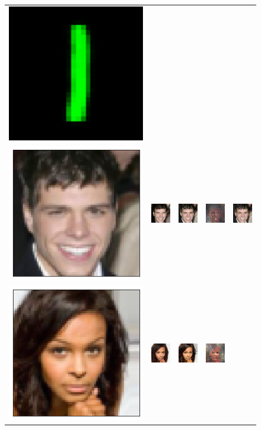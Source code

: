 \begin{figure}
\begin{tabular}{ccccc}
        \includegraphics[width=0.1\linewidth]{pics/3_adv_att/color_mnist_adv_rec_hmc_9.pdf}\\
        \includegraphics[width=0.1\linewidth]{pics/3_adv_att/celeba_ref_1.png} & \includegraphics[width=0.1\linewidth]{pics/3_adv_att/celeba_ref_rec_1.png} &
        \includegraphics[width=0.1\linewidth]{pics/3_adv_att/celeba_adv_1.png} & \includegraphics[width=0.1\linewidth]{pics/3_adv_att/celeba_adv_rec_1.png} & 
        \includegraphics[width=0.1\linewidth]{pics/3_adv_att/celeba_adv_rec_hmc_1.png}\\
        \includegraphics[width=0.1\linewidth]{pics/3_adv_att/celeba_ref_2.png} & \includegraphics[width=0.1\linewidth]{pics/3_adv_att/celeba_ref_rec_2.png} &
        \includegraphics[width=0.1\linewidth]{pics/3_adv_att/celeba_adv_2.png} & \includegraphics[width=0.1\linewidth]{pics/3_adv_att/celeba_adv_rec_2.png} & 

\end{tabular}
\end{figure}

